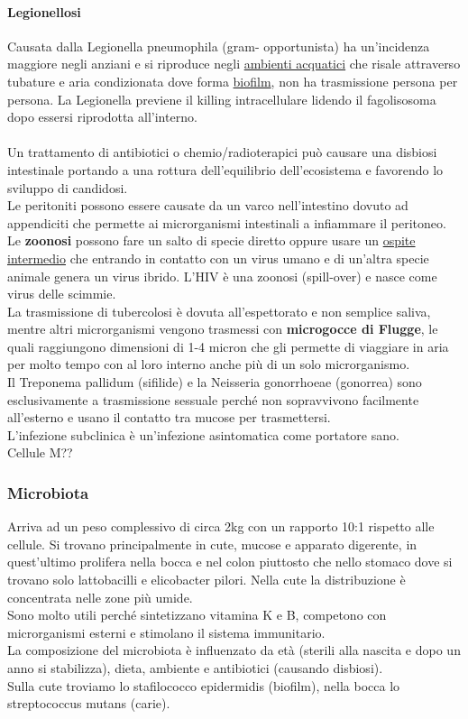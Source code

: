 \documentclass[10pt]{article}
\begin{document}
\paragraph*{Legionellosi} Causata dalla Legionella pneumophila (gram- opportunista) ha un'incidenza maggiore negli anziani e si riproduce negli \underline{ambienti acquatici} che risale attraverso tubature e aria condizionata dove forma \underline{biofilm}, non ha trasmissione persona per persona. La Legionella previene il killing intracellulare lidendo il fagolisosoma dopo essersi riprodotta all'interno. \\\\
Un trattamento di antibiotici o chemio/radioterapici può causare una disbiosi intestinale portando a una rottura dell'equilibrio dell'ecosistema e favorendo lo sviluppo di candidosi. \\
Le peritoniti possono essere causate da un varco nell'intestino dovuto ad appendiciti che permette ai microrganismi intestinali a infiammare il peritoneo.\\
Le \textbf{zoonosi} possono fare un salto di specie diretto oppure usare un \underline{ospite intermedio} che entrando in contatto con un virus umano e di un'altra specie animale genera un virus ibrido. L'HIV è una zoonosi (spill-over) e nasce come virus delle scimmie.\\
La trasmissione di tubercolosi è dovuta all'espettorato e non semplice saliva, mentre altri microrganismi vengono trasmessi con \textbf{microgocce di Flugge}, le quali raggiungono dimensioni di 1-4 micron che gli permette di viaggiare in aria per molto tempo con al loro interno anche più di un solo microrganismo.\\
Il Treponema pallidum (sifilide) e la Neisseria gonorrhoeae (gonorrea) sono esclusivamente a trasmissione sessuale perché non sopravvivono facilmente all'esterno e usano il contatto tra mucose per trasmettersi. \\
L'infezione subclinica è un'infezione asintomatica come portatore sano. \\
Cellule M??
\subsubsection*{Microbiota} 
Arriva ad un peso complessivo di circa 2kg con un rapporto 10:1 rispetto alle cellule. Si trovano principalmente in cute, mucose e apparato digerente, in quest'ultimo prolifera nella bocca e nel colon piuttosto che nello stomaco dove si trovano solo lattobacilli e elicobacter pilori. Nella cute la distribuzione è concentrata nelle zone più umide.\\
Sono molto utili perché sintetizzano vitamina K e B, competono con microrganismi esterni e stimolano il sistema immunitario.\\
La composizione del microbiota è influenzato da età (sterili alla nascita e dopo un anno si stabilizza), dieta, ambiente e antibiotici (causando disbiosi). \\
Sulla cute troviamo lo stafilococco epidermidis (biofilm), nella bocca lo streptococcus mutans (carie). 
\end{document}
